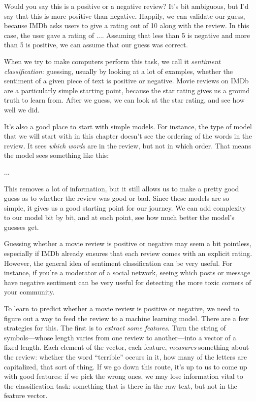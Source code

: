 \documentclass{pca}
\newenvironment{aside}{
	\setlength{\leftskip}{1em}\par\itshape
}{
	
	\setlength{\leftskip}{0em}\par
}
\newcommand{\rc}[1]{{\color{my-red} #1}}
\newcommand{\bc}[1]{{\color{my-blue} #1}}
\theoremstyle{theorem}
\theoremstyle{definition}
\theoremstyle{proof}
\begin{document}
\blockquote{}

Would you say this is a \bc{positive} or a \rc{negative} review? It's bit ambiguous, but I'd say that this is more positive than negative. Happily, we can validate our guess, because IMDb asks users to give a rating out of 10 along with the review. In this case, the user gave a rating of .... Assuming that less than 5 is negative and more than 5 is positive, we can assume that our guess was correct.

When we try to make computers perform this task, we call it \emph{sentiment classification}: guessing, usually by looking at a lot of examples, whether the sentiment of a given piece of text is positive or negative. Movie reviews on IMDb are a particularly simple starting point, because the star rating gives us a ground truth to learn from. After we guess, we can look at the star rating, and see how well we did. 

It's also a good place to start with simple models. For instance, the type of model that we will start with in this chapter doesn't see the ordering of the words in the review. It sees \emph{which words} are in the review, but not in which order. That means the model sees something like this:

...

This removes a lot of information, but it still allows us to make a pretty good guess as to whether the review was good or bad. Since these models are so simple, it gives us a good starting point for our journey. We can add complexity to our model bit by bit, and at each point, see how much better the model's guesses get.

\begin{aside}
Guessing whether a movie review is positive or negative may seem a bit pointless, especially if IMDb already ensures that each review comes with an explicit rating. However, the general idea of sentiment classification can be very useful. For instance, if you're a moderator of a social network, seeing which posts or message have negative sentiment can be very useful for detecting the more toxic corners of your community.
\end{aside}

To learn to predict whether a movie review is positive or negative, we need to figure out a way to feed the review to a machine learning model. There are a few strategies for this. The first is to \emph{extract some features}. Turn the string of symbols---whose length varies from one review to another---into a vector of a fixed length. Each element of the vector, each feature, \emph{measures} something about the review: whether the word ``terrible'' occurs in it, how many of the letters are capitalized, that sort of thing. If we go down this route, it's up to us to come up with good features: if we pick the wrong ones, we may lose information vital to the classification task: something that is there in the raw text, but not in the feature vector. 
\end{document}

